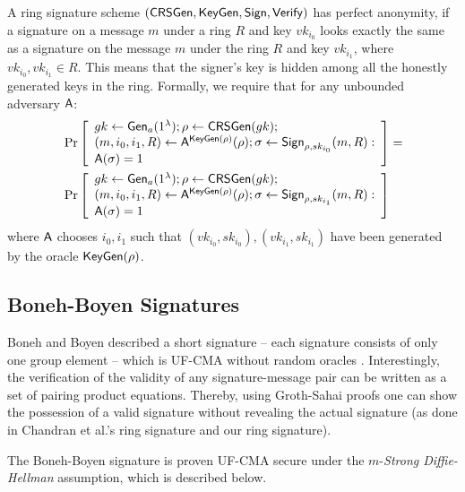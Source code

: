 \begin{definition}
A ring signature scheme
$(\mathsf{CRSGen},\allowbreak \mathsf{KeyGen},\allowbreak \mathsf{Sign}, \mathsf{Verify})$ has perfect anonymity, if a signature on a message
$m$ under a ring $R$ and key $vk_{i_0}$
looks exactly the same as a signature on the
message $m$ under the ring $R$ and key $vk_{i_1}$, where $vk_{i_0},vk_{i_1}\in R$. This means that the signer's key is hidden
among all the honestly generated keys in the ring. Formally, we require that for any unbounded
adversary $\mathsf{A}$:
\begin{align*}
&\Pr\left[\begin{array}{l}
gk\gets\mathsf{Gen}_a(1^\lambda);\rho\gets\mathsf{CRSGen}(gk);\\
(m,i_0,i_1,R)\gets\mathsf{A}^{\mathsf{KeyGen}(\rho)}(\rho);\sigma\gets\mathsf{Sign}_{\rho,sk_{i_0}}(m,R):\\
\mathsf{A}(\sigma)=1
\end{array}\right]
=\\
&\Pr\left[\begin{array}{l}
gk\gets\mathsf{Gen}_a(1^\lambda);\rho\gets\mathsf{CRSGen}(gk);\\
(m,i_0,i_1,R)\gets\mathsf{A}^{\mathsf{KeyGen}(\rho)}(\rho);\sigma\gets\mathsf{Sign}_{\rho,sk_{i_1}}(m,R):\\
\mathsf{A}(\sigma)=1
\end{array}\right]
\end{align*}
where $\mathsf{A}$ chooses $i_0, i_1$ such that $(vk_{i_0}, sk_{i_0}),(vk_{i_1}, sk_{i_1})$ have been generated by the
oracle $\mathsf{KeyGen}(\rho)$.
\end{definition}

\subsection{Boneh-Boyen Signatures} \label{sec:bbs}

Boneh and Boyen described a short signature -- each signature consists of only one group element -- which is UF-CMA without random oracles \cite{EC:BonBoy04a}. Interestingly, the verification of the validity of any signature-message pair can be written as a set of pairing product equations. Thereby, using Groth-Sahai proofs one can show the possession of a valid signature without revealing the actual signature (as done in Chandran et al.'s ring signature and our ring signature).

The Boneh-Boyen signature is proven UF-CMA secure under the $m$-\emph{Strong Diffie-Hellman} assumption, which is described below.

